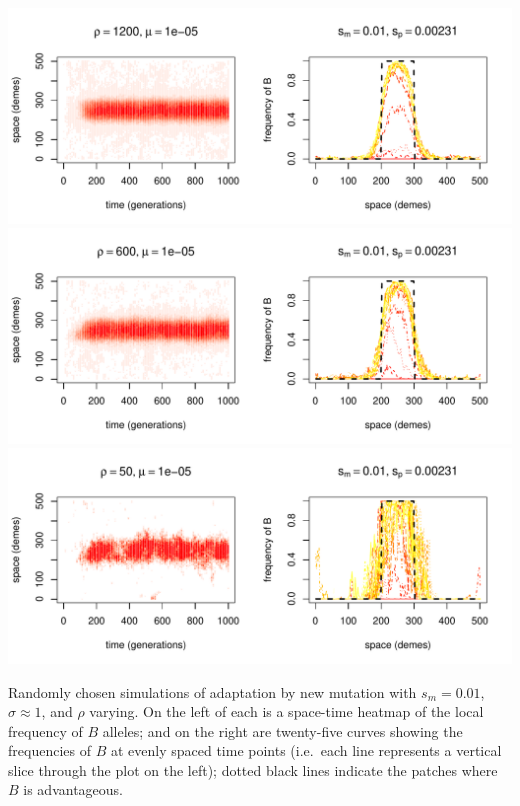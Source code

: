 \documentclass{article}
\begin{document}
\begin{sfigure}
  \begin{center}
    \includegraphics{example-mutation-sims/43099-r1-501-sb0_01-sm-0_01-N1200-pophistory-run}
    \includegraphics{example-mutation-sims/69787-r1-501-sb0_01-sm-0_01-N600-pophistory-run}
    \includegraphics{example-mutation-sims/11821-r1-501-sb0_01-sm-0_01-N50-pophistory-run}
  \end{center}
  \caption{
    Randomly chosen simulations of adaptation by new mutation
    with $s_m=0.01$, $\sigma\approx 1$, and $\rho$ varying.
    On the left of each is a space-time heatmap of the local frequency of $B$ alleles;
    and on the right are twenty-five curves showing the frequencies of $B$ at evenly spaced time points
    (i.e.\ each line represents a vertical slice through the plot on the left);
    dotted black lines indicate the patches where $B$ is advantageous.
  } \label{sfig:sims_2}
\end{sfigure}
\end{document}
